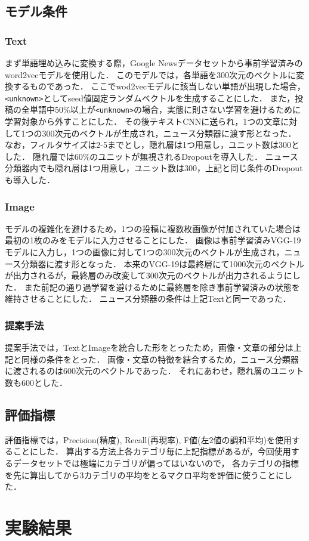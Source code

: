 %
\subsection{モデル条件}
\subsubsection{Text}
まず単語埋め込みに変換する際，Google Newsデータセットから事前学習済みのword2vecモデル\cite{google_2013}を使用した．
このモデルでは，各単語を300次元のベクトルに変換するものであった．
ここでwod2vecモデルに該当しない単語が出現した場合，\texttt{<unknown>}としてseed値固定ランダムベクトルを生成することにした．
また，投稿の全単語中50\%以上が\texttt{<unknown>}の場合，実態に則さない学習を避けるために学習対象から外すことにした．
その後テキストCNNに送られ，1つの文章に対して1つの300次元のベクトルが生成され，ニュース分類器に渡す形となった．
なお，フィルタサイズは2-5までとし，隠れ層は1つ用意し，ユニット数は300とした．
隠れ層では60\%のユニットが無視されるDropoutを導入した．
ニュース分類器内でも隠れ層は1つ用意し，ユニット数は300，上記と同じ条件のDropoutも導入した．
%
\subsubsection{Image}
モデルの複雑化を避けるため，1つの投稿に複数枚画像が付加されていた場合は最初の1枚のみをモデルに入力させることにした．
画像は事前学習済みVGG-19モデルに入力し，1つの画像に対して1つの300次元のベクトルが生成され，ニュース分類器に渡す形となった．
本来のVGG-19は最終層にて1000次元のベクトルが出力されるが，最終層のみ改変して300次元のベクトルが出力されるようにした．
また前記の通り過学習を避けるために最終層を除き事前学習済みの状態を維持させることにした．
ニュース分類器の条件は上記Textと同一であった．
%
\subsubsection{提案手法}
提案手法では，TextとImageを統合した形をとったため，画像・文章の部分は上記と同様の条件をとった．
画像・文章の特徴を結合するため，ニュース分類器に渡されるのは600次元のベクトルであった．
それにあわせ，隠れ層のユニット数も600とした．
%
\subsection{評価指標}
評価指標では，Precision(精度), Recall(再現率), F値(左2値の調和平均)を使用することにした．
算出する方法上各カテゴリ毎に上記指標があるが，今回使用するデータセットでは極端にカテゴリが偏ってはいないので，
各カテゴリの指標を先に算出してから3カテゴリの平均をとるマクロ平均を評価に使うことにした．

\section{実験結果}
% 
